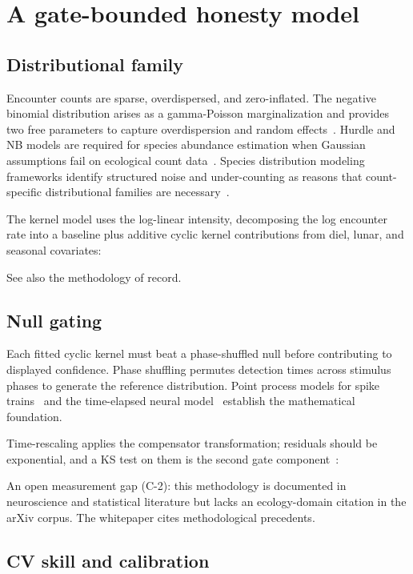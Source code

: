 \section{A gate-bounded honesty model}

\subsection{Distributional family}

Encounter counts are sparse, overdispersed, and zero-inflated. The negative binomial distribution arises as a gamma-Poisson marginalization and provides two free parameters to capture overdispersion and random effects~\cite{arxiv11123605}. Hurdle and NB models are required for species abundance estimation when Gaussian assumptions fail on ecological count data~\cite{arxiv201016040}. Species distribution modeling frameworks identify structured noise and under-counting as reasons that count-specific distributional families are necessary~\cite{arxiv210208534}.

The kernel model uses the log-linear intensity, decomposing the log encounter rate into a baseline plus additive cyclic kernel contributions from diel, lunar, and seasonal covariates:

\eqintensity

See also the methodology of record.

\subsection{Null gating}

Each fitted cyclic kernel must beat a phase-shuffled null before contributing to displayed confidence. Phase shuffling permutes detection times across stimulus phases to generate the reference distribution. Point process models for spike trains~\cite{arxiv201004875} and the time-elapsed neural model~\cite{arxiv150602361} establish the mathematical foundation. \eqnulltest

Time-rescaling applies the compensator transformation; residuals should be exponential, and a KS test on them is the second gate component~\cite{arxiv160603988}:

\eqtrescaling

An open measurement gap (C-2): this methodology is documented in neuroscience and statistical literature but lacks an ecology-domain citation in the arXiv corpus. The whitepaper cites methodological precedents.

\subsection{CV skill and calibration}

